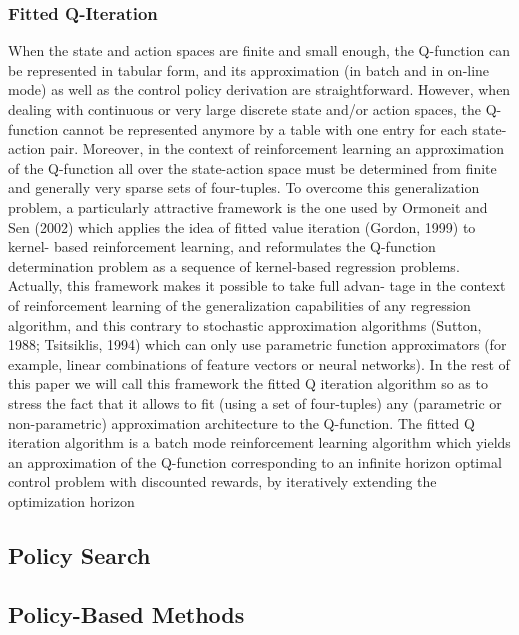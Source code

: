 \subsubsection{Fitted Q-Iteration}
When the state and action spaces are finite and small enough, the Q-function can be represented
in tabular form, and its approximation (in batch and in on-line mode) as well as the control policy
derivation are straightforward. However, when dealing with continuous or very large discrete state
and/or action spaces, the Q-function cannot be represented anymore by a table with one entry for
each state-action pair. Moreover, in the context of reinforcement learning an approximation of the
Q-function all over the state-action space must be determined from finite and generally very sparse
sets of four-tuples.
To overcome this generalization problem, a particularly attractive framework is the one used by
Ormoneit and Sen (2002) which applies the idea of fitted value iteration (Gordon, 1999) to kernel-
based reinforcement learning, and reformulates the Q-function determination problem as a sequence
of kernel-based regression problems. Actually, this framework makes it possible to take full advan-
tage in the context of reinforcement learning of the generalization capabilities of any regression
algorithm, and this contrary to stochastic approximation algorithms (Sutton, 1988; Tsitsiklis, 1994)
which can only use parametric function approximators (for example, linear combinations of feature
vectors or neural networks). In the rest of this paper we will call this framework the fitted Q iteration
algorithm so as to stress the fact that it allows to fit (using a set of four-tuples) any (parametric or
non-parametric) approximation architecture to the Q-function.
The fitted Q iteration algorithm is a batch mode reinforcement learning algorithm which yields
an approximation of the Q-function corresponding to an infinite horizon optimal control problem
with discounted rewards, by iteratively extending the optimization horizon



\subsection{Policy Search}
\subsection{Policy-Based Methods}

